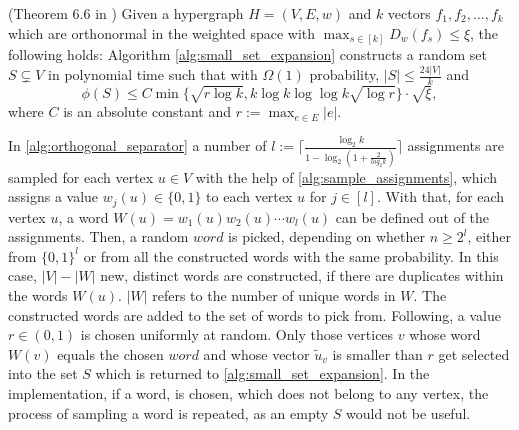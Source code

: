 \begin{fact}{(Theorem 6.6 in \cite{ChanLTZ16})}\label{fact:small_xi}
	Given a hypergraph $H = (V, E, w)$ and $k$ vectors $f_1, f_2, \ldots , f_k$ which are orthonormal in the weighted space with $ \max_{s \in [k]} D_w(f_s) \le \xi $, the following holds: Algorithm \ref{alg:small_set_expansion} constructs a random set $S \subsetneq V$ in polynomial time such that with $\Omega(1)$ probability, $|S| \le \frac{24|V|}{k}$ and
	\begin{equation}\label{eq:small_expansion}
	\phi(S) \le C \min\{\sqrt{r \log k}, k \log k  \log \log k \sqrt{\log r} \} \cdot \sqrt{\xi},
	\end{equation}
	where $C$ is an absolute constant and $r := \max_{e\in E} |e|$.
\end{fact}


In \cref{alg:orthogonal_separator} a number of $l := \lceil \frac{\log_2 k}{1-\log_2 (1+\frac{2}{log_2 k})}\rceil$ assignments are sampled for each vertex $u \in V$ with the help of \cref{alg:sample_assignments}, which assigns a value $w_j(u) \in \{0,1\}$ to each vertex $u$ for $j \in [l]$. With that, for each vertex $u$, a word $W(u) =  w_1(u)w_2(u)\cdots w_l(u)$ can be defined out of the assignments. Then, a random $word$ is picked, depending on whether $n\ge 2^l$, either from $\{0,1\}^l$ or from all the constructed words with the same probability. In this case, $|V|-|W| $ new, distinct words are constructed, if there are duplicates within the words $W(u)$. $|W|$ refers to the number of unique words in $W$. The constructed words are added to the set of words to pick from. Following, a value $r\in(0,1)$ is chosen uniformly at random. Only those vertices $v$ whose word $W(v)$ equals the chosen $word$ and whose vector $\tilde{u}_v$ is smaller than $r$ get selected into the set $S$ which is returned to \cref{alg:small_set_expansion}. In the implementation, if a word, is chosen, which does not belong to any vertex, the process of sampling a word is repeated, as an empty $S$ would not be useful.

